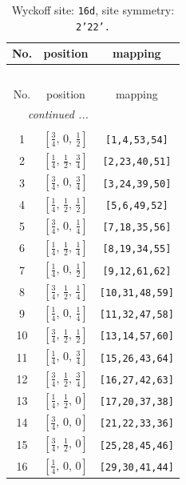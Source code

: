 \documentclass[fleqn,8pt]{jsarticle}
\begin{document}
\renewcommand{\arraystretch}{1.2}
\begin{longtable}{ccc}
\caption{Wyckoff site: {\tt 16d}, site symmetry: {\tt 2'22'.}}
 \\
 \hline \hline
No. & position & mapping \\ \hline \endfirsthead

\multicolumn{2}{l}{\tablename\ \thetable{}} \\
 \hline \hline
No. & position & mapping \\ \hline \endhead

 \hline \hline
\multicolumn{2}{r}{\footnotesize\it continued ...} \\ \endfoot

 \hline \hline
\multicolumn{2}{r}{} \\ \endlastfoot

1 & $\left[ \frac{3}{4},\, 0,\, \frac{1}{2} \right]$ & {\tt [1,4,53,54]} \\ \hline
2 & $\left[ \frac{1}{4},\, \frac{1}{2},\, \frac{3}{4} \right]$ & {\tt [2,23,40,51]} \\ \hline
3 & $\left[ \frac{3}{4},\, 0,\, \frac{3}{4} \right]$ & {\tt [3,24,39,50]} \\ \hline
4 & $\left[ \frac{1}{4},\, \frac{1}{2},\, \frac{1}{2} \right]$ & {\tt [5,6,49,52]} \\ \hline
5 & $\left[ \frac{3}{4},\, 0,\, \frac{1}{4} \right]$ & {\tt [7,18,35,56]} \\ \hline
6 & $\left[ \frac{1}{4},\, \frac{1}{2},\, \frac{1}{4} \right]$ & {\tt [8,19,34,55]} \\ \hline
7 & $\left[ \frac{1}{4},\, 0,\, \frac{1}{2} \right]$ & {\tt [9,12,61,62]} \\ \hline
8 & $\left[ \frac{3}{4},\, \frac{1}{2},\, \frac{1}{4} \right]$ & {\tt [10,31,48,59]} \\ \hline
9 & $\left[ \frac{1}{4},\, 0,\, \frac{1}{4} \right]$ & {\tt [11,32,47,58]} \\ \hline
10 & $\left[ \frac{3}{4},\, \frac{1}{2},\, \frac{1}{2} \right]$ & {\tt [13,14,57,60]} \\ \hline
11 & $\left[ \frac{1}{4},\, 0,\, \frac{3}{4} \right]$ & {\tt [15,26,43,64]} \\ \hline
12 & $\left[ \frac{3}{4},\, \frac{1}{2},\, \frac{3}{4} \right]$ & {\tt [16,27,42,63]} \\ \hline
13 & $\left[ \frac{1}{4},\, \frac{1}{2},\, 0 \right]$ & {\tt [17,20,37,38]} \\ \hline
14 & $\left[ \frac{3}{4},\, 0,\, 0 \right]$ & {\tt [21,22,33,36]} \\ \hline
15 & $\left[ \frac{3}{4},\, \frac{1}{2},\, 0 \right]$ & {\tt [25,28,45,46]} \\ \hline
16 & $\left[ \frac{1}{4},\, 0,\, 0 \right]$ & {\tt [29,30,41,44]} \\
\end{longtable}
\end{document}
